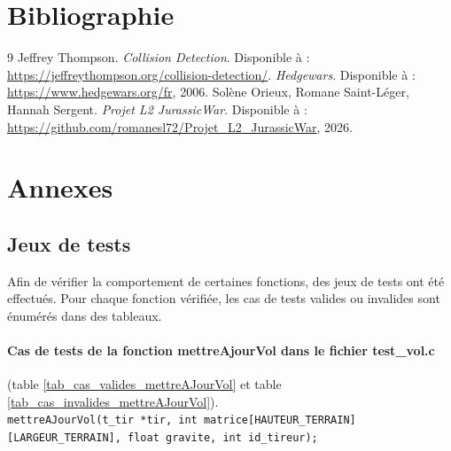 \documentclass[11pt,a4paper]{article}
\begin{document}
\section{Bibliographie}
\begin{thebibliography}{9}
Jeffrey Thompson.
\textit{Collision Detection}.
Disponible à : \url{https://jeffreythompson.org/collision-detection/}.
\textit{Hedgewars}.
Disponible à : \url{https://www.hedgewars.org/fr}, 2006.
Solène Orieux, Romane Saint-Léger, Hannah Sergent.
\textit{Projet L2 JurassicWar}.
Disponible à : \url{https://github.com/romanesl72/Projet_L2_JurassicWar}, 2026.

\end{thebibliography}
\printglossaries

\newpage
\section{Annexes}
\subsection{Jeux de tests}
Afin de vérifier la comportement de certaines fonctions, des jeux de tests ont été effectués. Pour chaque fonction vérifiée, les cas de tests valides ou invalides sont énumérés dans des tableaux.
\paragraph{Cas de tests de la fonction mettreAjourVol dans le fichier test\_vol.c}
(table \ref{tab_cas_valides_mettreAJourVol} et table \ref{tab_cas_invalides_mettreAJourVol}).
\\
\texttt{mettreAJourVol(t\_tir *tir, int matrice[HAUTEUR\_TERRAIN][LARGEUR\_TERRAIN], float gravite, int id\_tireur);}
\end{document}
